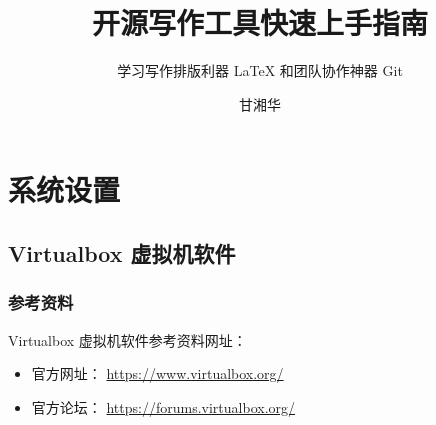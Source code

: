 \documentclass[
    11pt,
    cite=authoryear,
    device=phone,
    lang=cn,
    mode=simple,
    result=answer,
    toc=onecol,
]{elegantbook_sierxue}
\title{开源写作工具快速上手指南}
\subtitle{学习写作排版利器 \LaTeX{} 和团队协作神器 Git}
\author{甘湘华}
\institute{西南财经大学} %
\date{\zhtoday}
\begin{document}
\maketitle

\setcounter{tocdepth}{2}
\tableofcontents

\mainmatter%
\hypersetup{pageanchor=true}

\chapter{系统设置}%
\label{cha:settings-system}

\section{Virtualbox 虚拟机软件}%
\label{sec:vbox}

\subsection{参考资料}%
\label{sub:vbox-refs}

Virtualbox 虚拟机软件参考资料网址：
\begin{itemize}
    \item 官方网址： \href{https://www.virtualbox.org/}{https://www.virtualbox.org/}
    \item 官方论坛： \href{https://forums.virtualbox.org/}{https://forums.virtualbox.org/}
\end{itemize}
\end{document}
